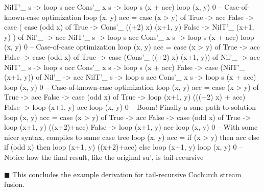 \begin{spec}
    NilT'_ s -> loop s acc
    Cons'_ x s -> loop s (x + acc)
loop (x, y) 0
-- Case-of-known-case optimization
loop (x, y) acc = case (x > y) of
  True -> acc
  False -> case (
    case (odd x) of
      True -> Cons'_ ((+2) x) (x+1, y)
      False -> NilT'_ (x+1, y)
  ) of
    Nil'_ -> acc
    NilT'_ s -> loop s acc
    Cons'_ x s -> loop s (x + acc)
loop (x, y) 0
-- Case-of-case optimization
loop (x, y) acc = case (x > y) of
  True -> acc
  False -> case (odd x) of
    True -> case (Cons'_ ((+2) x) (x+1, y)) of
      Nil'_ -> acc
      NilT'_ s -> loop s acc
      Cons'_ x s -> loop s (x + acc)
    False -> case (NilT'_ (x+1, y)) of
      Nil'_ -> acc
      NilT'_ s -> loop s acc
      Cons'_ x s -> loop s (x + acc)
loop (x, y) 0
-- Case-of-known-case optimization
loop (x, y) acc = case (x > y) of
  True -> acc
  False -> case (odd x) of
    True -> loop (x+1, y) (((+2) x) + acc)
    False -> loop (x+1, y) acc
loop (x, y) 0
-- Boom! Finally a sane path to solution
loop (x, y) acc = case (x > y) of
  True -> acc
  False -> case (odd x) of
    True -> loop (x+1, y) ((x+2)+acc)
    False -> loop (x+1, y) acc
loop (x, y) 0
-- With some nicer syntax, compiles to same case tree
loop (x, y) acc = if (x > y)
                  then acc
                  else if (odd x)
                       then loop (x+1, y) ((x+2)+acc)
                       else loop (x+1, y)
loop (x, y) 0
-- Notice how the final result, like the original su', is tail-recursive
\end{spec}
$\blacksquare$
This concludes the example derivation for tail-recursive Cochurch stream fusion.